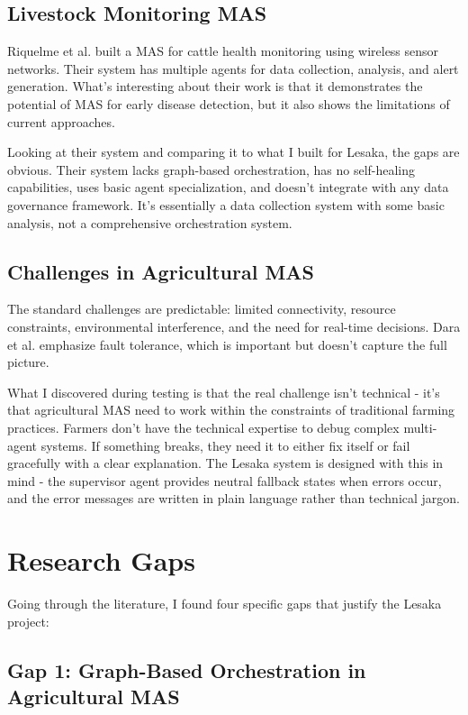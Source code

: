 \subsection{Livestock Monitoring MAS}

Riquelme et al. \cite{riquelme2018smonitor} built a MAS for cattle health monitoring using wireless sensor networks. Their system has multiple agents for data collection, analysis, and alert generation. What's interesting about their work is that it demonstrates the potential of MAS for early disease detection, but it also shows the limitations of current approaches.

Looking at their system and comparing it to what I built for Lesaka, the gaps are obvious. Their system lacks graph-based orchestration, has no self-healing capabilities, uses basic agent specialization, and doesn't integrate with any data governance framework. It's essentially a data collection system with some basic analysis, not a comprehensive orchestration system.

\subsection{Challenges in Agricultural MAS}

The standard challenges are predictable: limited connectivity, resource constraints, environmental interference, and the need for real-time decisions. Dara et al. \cite{dara2018precision} emphasize fault tolerance, which is important but doesn't capture the full picture.

What I discovered during testing is that the real challenge isn't technical - it's that agricultural MAS need to work within the constraints of traditional farming practices. Farmers don't have the technical expertise to debug complex multi-agent systems. If something breaks, they need it to either fix itself or fail gracefully with a clear explanation. The Lesaka system is designed with this in mind - the supervisor agent provides neutral fallback states when errors occur, and the error messages are written in plain language rather than technical jargon.

\section{Research Gaps}

Going through the literature, I found four specific gaps that justify the Lesaka project:

\subsection{Gap 1: Graph-Based Orchestration in Agricultural MAS}

